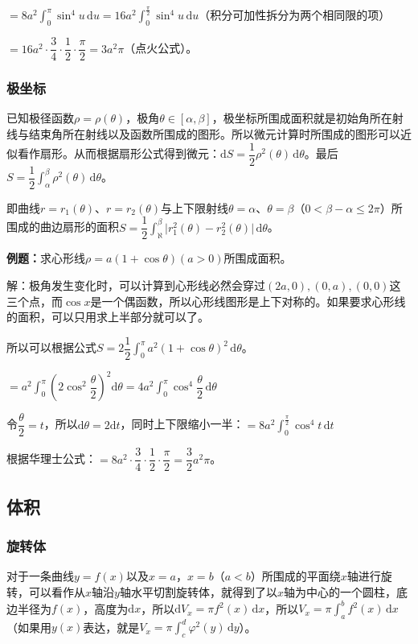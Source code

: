 \documentclass[UTF8, 12pt]{ctexart}
\begin{document}
$=8a^2\int_0^\pi\sin^4u\,\textrm{d}u=16a^2\int_0^{\frac{\pi}{2}}\sin^4u\,\textrm{d}u$（积分可加性拆分为两个相同限的项）

$=16a^2\cdot\dfrac{3}{4}\cdot\dfrac{1}{2}\cdot\dfrac{\pi}{2}=3a^2\pi$（点火公式）。

\subsubsection{极坐标}

已知极径函数$\rho=\rho(\theta)$，极角$\theta\in[\alpha,\beta]$，极坐标所围成面积就是初始角所在射线与结束角所在射线以及函数所围成的图形。所以微元计算时所围成的图形可以近似看作扇形。从而根据扇形公式得到微元：$\textrm{d}S=\dfrac{1}{2}\rho^2(\theta)\,\textrm{d}\theta$。最后$S=\dfrac{1}{2}\int_\alpha^\beta\rho^2(\theta)\,\textrm{d}\theta$。

即曲线$r=r_1(\theta)$、$r=r_2(\theta)$与上下限射线$\theta=\alpha$、$\theta=\beta$（$0<\beta-\alpha\leqslant2\pi$）所围成的曲边扇形的面积$S=\dfrac{1}{2}\int_\aleph^\beta\vert r_1^2(\theta)-r_2^2(\theta)\vert\,\textrm{d}\theta$。

\textbf{例题：}求心形线$\rho=a(1+\cos\theta)(a>0)$所围成面积。

解：极角发生变化时，可以计算到心形线必然会穿过$(2a,0),(0,a),(0,0)$这三个点，而$\cos x$是一个偶函数，所以心形线图形是上下对称的。如果要求心形线的面积，可以只用求上半部分就可以了。

所以可以根据公式$S=2\dfrac{1}{2}\int_0^\pi a^2(1+\cos\theta)^2\,\textrm{d}\theta$。

$=a^2\displaystyle{\int_0^\pi\left(2\cos^2\dfrac{\theta}{2}\right)^2\textrm{d}\theta}=4a^2\displaystyle{\int_0^\pi\cos^4\dfrac{\theta}{2}\,\textrm{d}\theta}$

令$\dfrac{\theta}{2}=t$，所以$\textrm{d}\theta=2\textrm{d}t$，同时上下限缩小一半：$=8a^2\int_0^{\frac{\pi}{2}}\cos^4t\,\textrm{d}t$

根据华理士公式：$=8a^2\cdot\dfrac{3}{4}\cdot\dfrac{1}{2}\cdot\dfrac{\pi}{2}=\dfrac{3}{2}a^2\pi$。

\subsection{体积}

\subsubsection{旋转体}

对于一条曲线$y=f(x)$以及$x=a$，$x=b$（$a<b$）所围成的平面绕$x$轴进行旋转，可以看作从$x$轴沿$y$轴水平切割旋转体，就得到了以$x$轴为中心的一个圆柱，底边半径为$f(x)$，高度为$\textrm{d}x$，所以$\textrm{d}V_x=\pi f^2(x)\,\textrm{d}x$，所以$V_x=\pi\int_a^bf^2(x)\,\textrm{d}x$（如果用$y(x)$表达，就是$V_x=\pi\int_c^d\varphi^2(y)\,\textrm{d}y$）。
\end{document}
